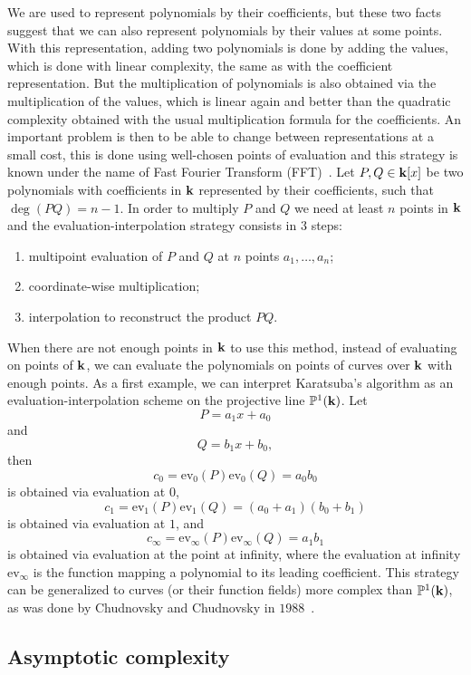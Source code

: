 We are used to represent polynomials by their coefficients, but these two facts
suggest that we can also represent polynomials by their values at some points.
With this representation, adding two polynomials is done by adding the
values, which is done with linear complexity, the same as with the coefficient
representation. But the multiplication of polynomials is also obtained via the
multiplication of the values, which is linear again and better than the
quadratic complexity obtained with the usual multiplication formula for the
coefficients. An important problem is then to be able to change between
representations at a small cost, this is done using well-chosen points of
evaluation and this strategy is known under the name of Fast Fourier
Transform (FFT)~\cite{GG13}. Let $P, Q\in\mathbf{k}[x]$ be two polynomials with
coefficients in $\mathbf{k}$ represented by their coefficients, such that
$\deg(PQ)=n-1$. In order to multiply $P$ and $Q$ we need at least $n$ points in
$\mathbf{k}$ and the evaluation-interpolation strategy consists in $3$ steps:
\begin{enumerate}
  \item multipoint evaluation of $P$ and $Q$ at $n$ points $a_1, \dots, a_n$;
  \item coordinate-wise multiplication;
  \item interpolation to reconstruct the product $PQ$.
\end{enumerate}
When there are not enough points in $\mathbf{k}$ to use this method, instead of
evaluating on points of $\mathbf{k}$, we can evaluate the polynomials on points of
curves over $\mathbf{k}$ with enough points. As a first example, we can interpret
Karatsuba's algorithm as an evaluation-interpolation scheme on
the projective line $\mathbb{P}^1(\mathbf{k})$. Let 
\[
  P = a_1 x + a_0
\]
and 
\[
  Q = b_1 x + b_0,
\]
then
\[
  c_0 = \textrm{ev}_0(P)\textrm{ev}_0(Q) = a_0b_0
\]
is obtained via evaluation at $0$,
\[
  c_1 = \textrm{ev}_1(P)\textrm{ev}_1(Q) = (a_0+a_1)(b_0+b_1)
\]
is obtained via evaluation at $1$, and
\[
  c_\infty = \textrm{ev}_\infty(P)\textrm{ev}_\infty(Q) = a_1b_1
\]
is obtained via evaluation at the point at infinity, where the evaluation at
infinity $\textrm{ev}_{\infty}$ is the function mapping a polynomial to its
leading coefficient. This strategy can be generalized to curves (or their
function fields) more complex
than $\mathbb{P}^1(\mathbf{k})$, as was done by Chudnovsky and Chudnovsky in
$1988$~\cite{CC88}.

\subsection{Asymptotic complexity}

